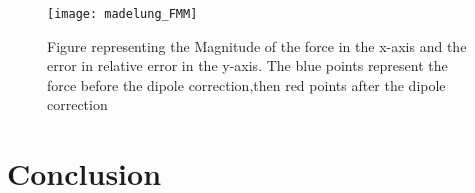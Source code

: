 \documentclass[12pt,twoside,a4paper]{report}
\begin{document}
 

\begin{figure}[H]
\centering
	\texttt{[image: madelung\_FMM]}
     
    \caption{Figure representing the Magnitude of the force in the x-axis and the  error in relative error in the y-axis. The blue points represent the force before the dipole correction,then red points after the dipole correction}    
   \end{figure}  

\chapter*{Conclusion}



\nocite{*}

 
\end{document}
